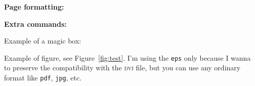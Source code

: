 \textbf{Page formatting:}
\begin{description}	
	\item[\PVerb{\addchap}]
	\item[\PVerb{\addsec}]
	\item[\PVerb{\addsubsec}]
	\item[\PVerb{\addsubsubsec}]
	
	\item[\PVerb{\abovechapterskip} ] 
	\item[\PVerb{\chapterbelowskip}]
	\item[\PVerb{\chapterinbetweenskip}]
	\item[\PVerb{\chapteralign}]
	\item[\PVerb{\chapterfont}]
	\item[\PVerb{\chapterprefixfont}]
	\item[\PVerb{\addchaptertocentry}]
	
	
	\item[\PVerb{\autodot}]
	\item[\PVerb{\mdtChapapp}]
	\item[\PVerb{\tttypeout}]
	\item[\PVerb{\bhrule}]
	\item[\PVerb{\blankpagestyle}]
	
\end{description}

\textbf{Extra commands:}
\begin{description}	
\item[\PVerb{\makequotation}]
\item[\PVerb{\makeabstract}]
\item[\PVerb{\urmstic}]
\item[\PVerb{\magicbox}]
\item[\PVerb{\simplebox}]
\item[\PVerb{\url}]

\end{description}


Example of a magic box:

\Blindtext%

Example of figure, see Figure~\ref{fig:test}. I'm using the \texttt{eps} only because   I wanna to preserve the compatibility with the \textsc{dvi} file, but you can use any ordinary format like \texttt{pdf}, \texttt{jpg}, etc.

